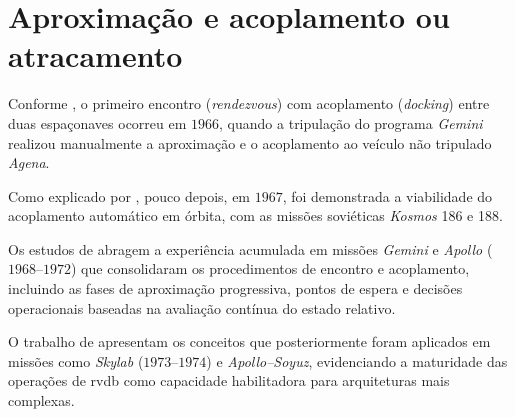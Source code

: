 \section{Aproximação e acoplamento ou atracamento}
\label{sec_rev_bib_rvdb}

Conforme \cite{nasa1stDocking}, o primeiro encontro (\textit{rendezvous}) com acoplamento (\textit{docking}) entre duas espaçonaves ocorreu em $1966$, quando a tripulação do programa \emph{Gemini} realizou manualmente a aproximação e o acoplamento ao veículo não tripulado \emph{Agena}.

Como explicado por \cite{nasaAutmaticDocking1967}, pouco depois, em $1967$, foi demonstrada a viabilidade do acoplamento automático em órbita, com as missões soviéticas \emph{Kosmos} 186 e 188.

Os estudos de \cite{goodman2011rendezvous} abragem a experiência acumulada em missões \textit{Gemini} e \textit{Apollo} ($1968$--$1972$) que consolidaram os procedimentos de encontro e acoplamento, incluindo as fases de aproximação progressiva, pontos de espera e decisões operacionais baseadas na avaliação contínua do estado relativo.

O trabalho de \cite{goodman2011rendezvous} apresentam os conceitos que posteriormente foram aplicados em missões como \emph{Skylab} ($1973$--$1974$) e \emph{Apollo--Soyuz}, evidenciando a maturidade das operações de \gls{rvdb} como capacidade habilitadora para arquiteturas mais complexas.







% 

% 

% 




